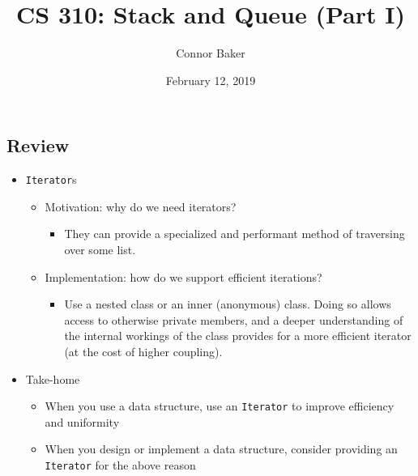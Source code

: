 \documentclass[10pt]{article}
\title{CS 310: Stack and Queue (Part I)}
\author{Connor Baker}
\date{February 12, 2019}
\begin{document}
\maketitle

\subsection*{Review}
\begin{itemize}
    \item \texttt{Iterator}s
    \begin{itemize}
        \item Motivation: why do we need iterators?
        \begin{itemize}
            \item They can provide a specialized and performant method of traversing over some list.
        \end{itemize}
        \item Implementation: how do we support efficient iterations?
        \begin{itemize}
            \item Use a nested class or an inner (anonymous) class. Doing so allows access to otherwise private members, and a deeper understanding of the internal workings of the class provides for a more efficient iterator (at the cost of higher coupling).
        \end{itemize}
    \end{itemize}
    \item Take-home
    \begin{itemize}
        \item When you use a data structure, use an \texttt{Iterator} to improve efficiency and uniformity
        \item When you design or implement a data structure, consider providing an \texttt{Iterator} for the above reason
    \end{itemize}
\end{itemize}
\end{document}
